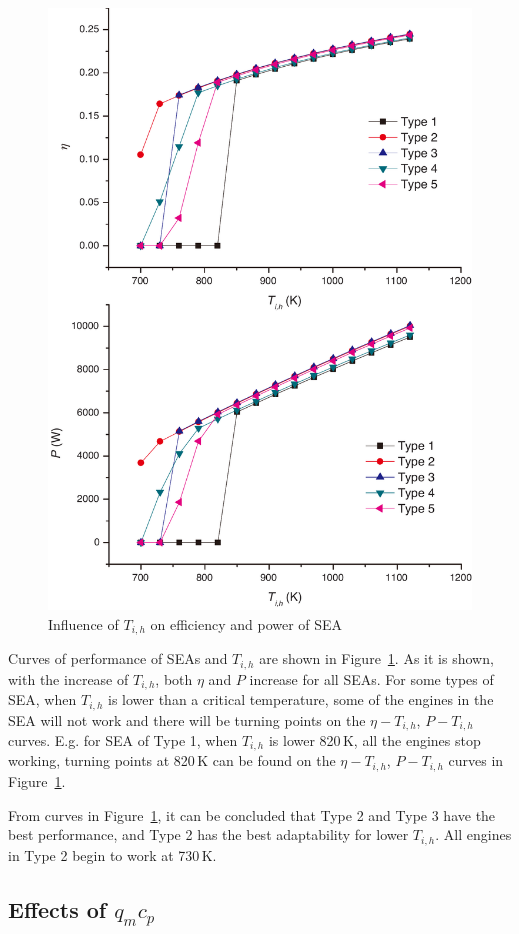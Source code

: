 \noindent \begin{figure}[htbp]
\begin{center}
	\includegraphics[width = 0.7\columnwidth]{./fig/T_ih}
	\caption{Influence of $T_{i,h}$ on efficiency and power of SEA}
	\label{fig:Ti_h}
\end{center}
\end{figure}

Curves of performance of SEAs and $T_{i,h}$ are shown in Figure~\ref{fig:Ti_h}.
As it is shown, with the increase of $T_{i,h}$, both $\eta$ and $P$ increase for all SEAs. For some types of SEA, when $T_{i,h}$ is lower than a critical temperature, some of the engines in the SEA will not work and there will be turning points on the $\eta-T_{i,h}$, $P-T_{i,h}$ curves. E.g. for SEA of Type 1, when $T_{i,h}$ is lower 820\,K, all the engines stop working, turning points at 820\,K can be found on the $\eta-T_{i,h}$, $P-T_{i,h}$ curves in Figure~\ref{fig:Ti_h}.

From curves in Figure~\ref{fig:Ti_h}, it can be concluded that Type 2 and Type 3 have the best performance, and Type 2 has the best adaptability for lower $T_{i,h}$. All engines in Type 2 begin to work at 730\,K.

\subsection{Effects of $q_mc_p$}

